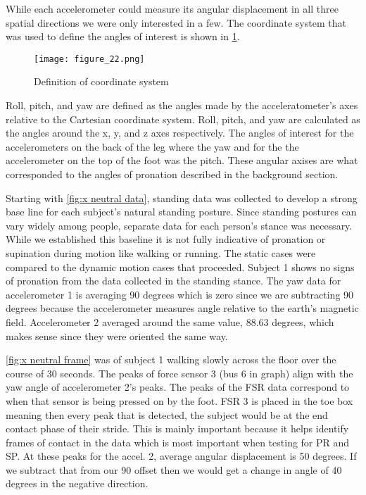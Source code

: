 While each accelerometer could measure its angular displacement in all three spatial directions we were only interested in a few.
The coordinate system that was used to define the angles of interest is shown in \ref{fig:x coords}.\par
\begin{figure}
  \centering
  \texttt{[image: figure\_22.png]}
  \caption[Coordinate system]{Definition of coordinate system}
  \label{fig:x coords}
\end{figure}
Roll, pitch, and yaw are defined as the angles made by the acceleratometer’s axes relative to the Cartesian coordinate system.
Roll, pitch, and yaw are calculated as the angles around the x, y, and z axes respectively.
The angles of interest for the accelerometers on the back of the leg where the yaw and for the the accelerometer on the top of the foot was the pitch.
These angular axises are what corresponded to the angles of pronation described in the background section.\par
Starting with \ref{fig:x neutral data}, standing data was collected to develop a strong base line for each subject's natural standing posture.
Since standing postures can vary widely among people, separate data for each person’s stance was necessary.
While we established this baseline it is not fully indicative of pronation or supination during motion like walking or running.
The static cases were compared to the dynamic motion cases that proceeded.
Subject 1 shows no signs of pronation from the data collected in the standing stance.
The yaw data for accelerometer 1 is averaging 90 degrees which is zero since we are subtracting 90 degrees because the accelerometer measures angle relative to the earth’s magnetic field.
Accelerometer 2 averaged around the same value, 88.63 degrees, which makes sense since they were oriented the same way.\par
\ref{fig:x neutral frame} was of subject 1 walking slowly across the floor over the course of 30 seconds.
The peaks of force sensor 3 (bus 6 in graph) align with the yaw angle of accelerometer 2’s peaks.
The peaks of the FSR data correspond to when that sensor is being pressed on by the foot.
FSR 3 is placed in the toe box meaning then every peak that is detected, the subject would be at the end contact phase of their stride.
This is mainly important because it helps identify frames of contact in the data which is most important when testing for PR and SP.
At these peaks for the accel. 2, average angular displacement is 50 degrees.
If we subtract that from our 90 offset then we would get a change in angle of 40 degrees in the negative direction.
